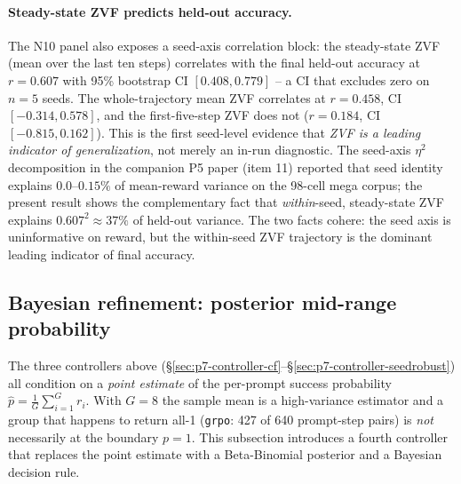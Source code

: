 \paragraph{Steady-state ZVF predicts held-out accuracy.}
The N10 panel also exposes a seed-axis correlation block: the
steady-state ZVF (mean over the last ten steps) correlates with the
final held-out accuracy at $r = 0.607$ with 95\% bootstrap CI
$[0.408, 0.779]$ -- a CI that excludes zero on $n{=}5$ seeds. The
whole-trajectory mean ZVF correlates at $r = 0.458$, CI
$[-0.314, 0.578]$, and the first-five-step ZVF does not
($r = 0.184$, CI $[-0.815, 0.162]$). This is the first seed-level
evidence that \emph{ZVF is a leading indicator of generalization}, not
merely an in-run diagnostic. The seed-axis $\eta^2$ decomposition in
the companion P5 paper (item 11) reported that seed identity explains
$0.0$--$0.15\%$ of mean-reward variance on the 98-cell mega corpus;
the present result shows the complementary fact that \emph{within}-seed,
steady-state ZVF explains $0.607^2 \approx 37\%$ of held-out
variance. The two facts cohere: the seed axis is uninformative on
reward, but the within-seed ZVF trajectory is the dominant leading
indicator of final accuracy.

\subsection{Bayesian refinement: posterior mid-range probability}
\label{sec:p7-bayesian}
The three controllers above (\S\ref{sec:p7-controller-cf}--\S\ref{sec:p7-controller-seedrobust})
all condition on a \emph{point estimate} of the per-prompt success
probability $\hat p = \frac{1}{G}\sum_{i=1}^G r_i$. With $G{=}8$ the
sample mean is a high-variance estimator and a group that happens
to return all-1 (\texttt{grpo}: 427 of 640 prompt-step pairs) is
\emph{not} necessarily at the boundary $p{=}1$. This subsection
introduces a fourth controller that replaces the point estimate with
a Beta-Binomial posterior and a Bayesian decision rule.

